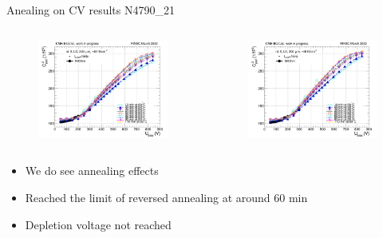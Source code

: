 \documentclass{beamer}
\begin{document}
\begin{frame}{Anealing on CV results N4790\_21}
  \begin{columns}
    \begin{figure}
        \includegraphics[width=1.0\textwidth]{plots/8in_198ch_2019_N4790_21_4E15_neg40degC_annealing_CV_ch101.png}    
    \end{figure}
    \begin{figure}
        \includegraphics[width=1.0\textwidth]{plots/8in_198ch_2019_N4790_21_4E15_neg40degC_annealing_CV_ch109.png}    
    \end{figure}
  \end{columns}
  \begin{itemize}
    \item We do see annealing effects
    \item Reached the limit of reversed annealing at around \alert{60 min}
    \item  Depletion voltage not reached 
  \end{itemize}
\end{frame}
\end{document}
